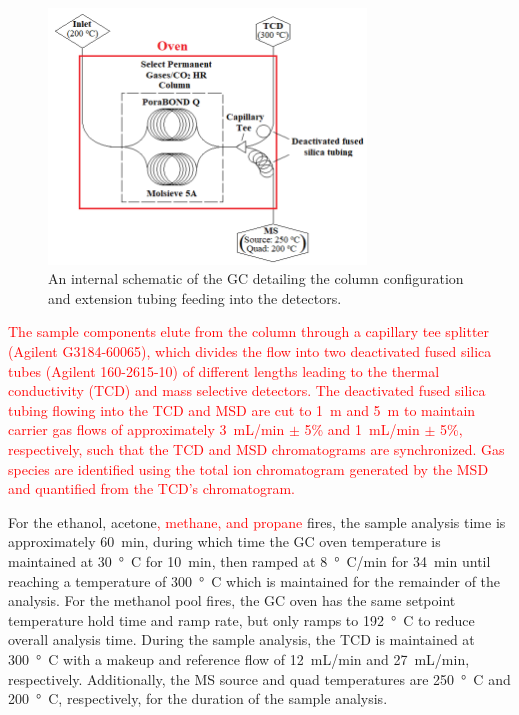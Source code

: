 \documentclass[12pt]{article}
\begin{document}
\begin{figure}[h!]
	\centering
\includegraphics[width=8.45cm,keepaspectratio]{GC_Internal.png}
	\caption[A schematic of the internal plumbing system in the gas chromatograph]{An internal schematic of the GC detailing the column configuration and extension tubing feeding into the detectors.}
	\label{fig:GC_Intern}
\end{figure}

\textcolor{red}{The sample components elute from the column through a capillary tee splitter (Agilent G3184-60065), which divides the flow into two deactivated fused silica tubes (Agilent 160-2615-10) of different lengths leading to the thermal conductivity (TCD) and mass selective detectors. The deactivated fused silica tubing flowing into the TCD and MSD are cut to 1~m and 5~m to maintain carrier gas flows of approximately 3~mL/min $\pm$ 5\% and 1~mL/min $\pm$ 5\%, respectively, such that the TCD and MSD chromatograms are synchronized. Gas species are identified using the total ion chromatogram generated by the MSD and quantified from the TCD's chromatogram.}

For the ethanol, acetone\textcolor{red}{, methane, and propane} fires, the sample analysis time is approximately \SI{60}{min}, during which time the GC oven temperature is maintained at \SI{30}{\degree C} for \SI{10}{min}, then ramped at \SI{8}{\degree C/min} for \SI{34}{min} until reaching a temperature of \SI{300}{\degree C} which is maintained for the remainder of the analysis. For the methanol pool fires, the GC oven has the same setpoint temperature hold time and ramp rate, but only ramps to \SI{192}{\degree C} to reduce overall analysis time. During the sample analysis, the TCD is maintained at \SI{300}{\degree C} with a makeup and reference flow of 12~mL/min and 27~mL/min, respectively. Additionally, the MS source and quad temperatures are \SI{250}{\degree C} and \SI{200}{\degree C}, respectively, for the duration of the sample analysis.
\end{document}
